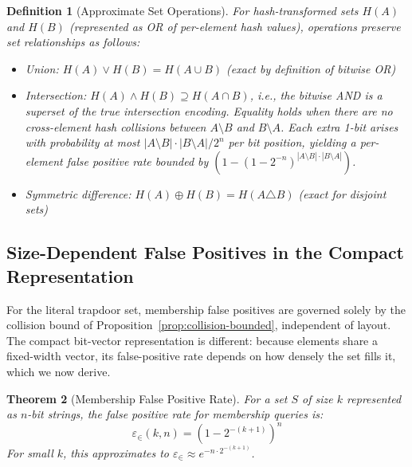 \documentclass[10pt,conference]{IEEEtran}
\newtheorem{theorem}{Theorem}
\newtheorem{definition}[theorem]{Definition}
\begin{document}
\begin{definition}[Approximate Set Operations]
For hash-transformed sets $H(A)$ and $H(B)$ (represented as OR of per-element hash values), operations preserve set relationships as follows:
\begin{itemize}
\item Union: $H(A) \lor H(B) = H(A \cup B)$ (exact by definition of bitwise OR)
\item Intersection: $H(A) \land H(B) \supseteq H(A \cap B)$, i.e., the bitwise AND is a superset of the true intersection encoding. Equality holds when there are no cross-element hash collisions between $A \setminus B$ and $B \setminus A$. Each extra 1-bit arises with probability at most $|A \setminus B| \cdot |B \setminus A| / 2^n$ per bit position, yielding a per-element false positive rate bounded by $(1 - (1-2^{-n})^{|A \setminus B| \cdot |B \setminus A|})$.
\item Symmetric difference: $H(A) \oplus H(B) = H(A \triangle B)$ (exact for disjoint sets)
\end{itemize}
\end{definition}

\subsection{Size-Dependent False Positives in the Compact Representation}
\label{sec:fpr-analysis}

For the literal trapdoor set, membership false positives are governed solely by the collision bound of Proposition~\ref{prop:collision-bounded}, independent of layout. The compact bit-vector representation is different: because elements share a fixed-width vector, its false-positive rate depends on how densely the set fills it, which we now derive.

\begin{theorem}[Membership False Positive Rate]
\label{thm:membership-fpr}
For a set $S$ of size $k$ represented as $n$-bit strings, the false positive rate for membership queries is:
$$\varepsilon_{\in}(k,n) = \left(1 - 2^{-(k+1)}\right)^n$$
For small $k$, this approximates to $\varepsilon_{\in} \approx e^{-n \cdot 2^{-(k+1)}}$.
\end{theorem}
\end{document}
